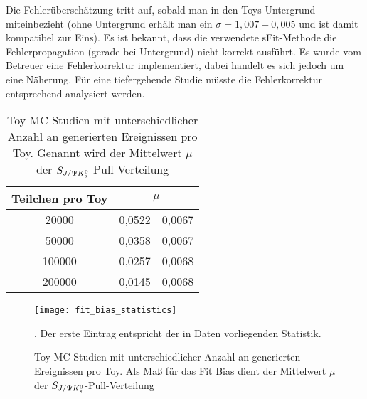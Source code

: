 Die Fehlerüberschätzung tritt auf, sobald man in den Toys Untergrund miteinbezieht (ohne Untergrund erhält man ein $\sigma=1,007\pm 0,005$ und ist damit kompatibel zur Eins). Es ist bekannt, dass die verwendete sFit-Methode die Fehlerpropagation (gerade bei Untergrund) nicht korrekt ausführt. Es wurde vom Betreuer eine Fehlerkorrektur implementiert, dabei handelt es sich jedoch um eine Näherung. Für eine tiefergehende Studie müsste die Fehlerkorrektur entsprechend analysiert werden.

\begin{table}[hptb]
\centering
\caption{Toy MC Studien mit unterschiedlicher Anzahl an generierten Ereignissen pro Toy. Genannt wird der Mittelwert $\mu$ der $S_{J/\Psi K_s^0}$-Pull-Verteilung}
\label{tab:fit_bias_events}
\begin{tabular}{cr@{$\pm$}l}
\hline \hline 
Teilchen pro Toy & \multicolumn{2}{c}{$\mu$}  \\ \hline
20000            &  0,0522 & 0,0067 \\
50000            &  0,0358 & 0,0067 \\
100000           &  0,0257 & 0,0068 \\
200000           &  0,0145 & 0,0068 \\ 
\hline \hline
\end{tabular}
\end{table}

\begin{figure}[hptb]
\centering
\texttt{[image: fit\_bias\_statistics]}
\caption{Toy MC Studien mit unterschiedlicher Anzahl an generierten Ereignissen pro Toy. Als Maß für das Fit Bias dient der Mittelwert $\mu$ der $S_{J/\Psi K_s^0}$-Pull-Verteilung}. Der erste Eintrag entspricht der in Daten vorliegenden Statistik.
\label{fig:fit_bias_events}
\end{figure}

